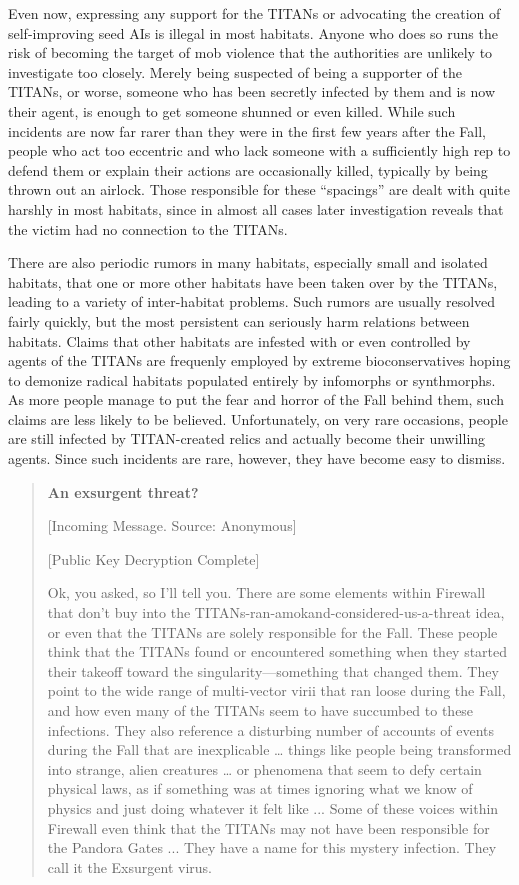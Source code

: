 Even now, expressing any support for the TITANs or advocating the
creation of self-improving seed AIs is illegal in most
habitats. Anyone who does so runs the risk of becoming the target of
mob violence that the authorities are unlikely to investigate too
closely.  Merely being suspected of being a supporter of the TITANs,
or worse, someone who has been secretly infected by them and is now
their agent, is enough to get someone shunned or even killed. While
such incidents are now far rarer than they were in the first few years
after the Fall, people who act too eccentric and who lack someone with
a sufficiently high rep to defend them or explain their actions are
occasionally killed, typically by being thrown out an airlock. Those
responsible for these “spacings” are dealt with quite harshly in most
habitats, since in almost all cases later investigation reveals that
the victim had no connection to the TITANs.

There are also periodic rumors in many habitats, especially small and
isolated habitats, that one or more other habitats have been taken
over by the TITANs, leading to a variety of inter-habitat
problems. Such rumors are usually resolved fairly quickly, but the
most persistent can seriously harm relations between habitats. Claims
that other habitats are infested with or even controlled by agents of
the TITANs are frequenly employed by extreme bioconservatives hoping
to demonize radical habitats populated entirely by infomorphs or
synthmorphs. As more people manage to put the fear and horror of the
Fall behind them, such claims are less likely to be
believed. Unfortunately, on very rare occasions, people are still
infected by TITAN-created relics and actually become their unwilling
agents. Since such incidents are rare, however, they have become easy
to dismiss.

\begin{quotation}
  \textbf{An exsurgent threat?}

  [Incoming Message. Source: Anonymous]

  [Public Key Decryption Complete]
  
  Ok, you asked, so I’ll tell you. There are some elements within
  Firewall that don’t buy into the
  TITANs-ran-amokand-considered-us-a-threat idea, or even that the
  TITANs are solely responsible for the Fall. These people think that
  the TITANs found or encountered something when they started their
  takeoff toward the singularity—something that changed them. They
  point to the wide range of multi-vector virii that ran loose during
  the Fall, and how even many of the TITANs seem to have succumbed to
  these infections. They also reference a disturbing number of
  accounts of events during the Fall that are inexplicable … things
  like people being transformed into strange, alien creatures … or
  phenomena that seem to defy certain physical laws, as if something
  was at times ignoring what we know of physics and just doing
  whatever it felt like ... Some of these voices within Firewall even
  think that the TITANs may not have been responsible for the Pandora
  Gates ... They have a name for this mystery infection.  They call it
  the Exsurgent virus.
\end{quotation}


